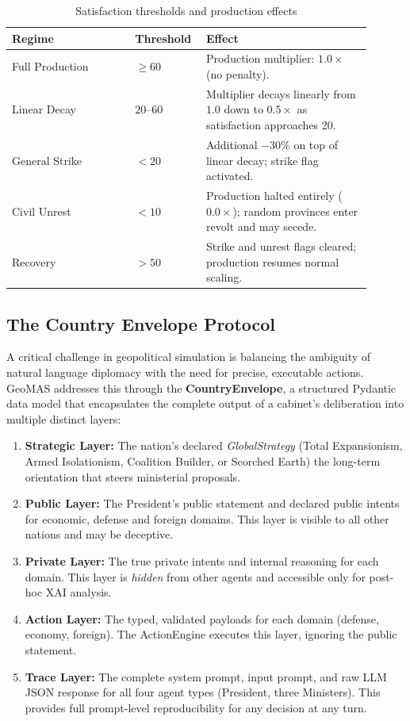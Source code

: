 \begin{table}[H]
\centering
\begin{tabular}{|p{0.32\linewidth}|p{0.15\linewidth}|p{0.43\linewidth}|}
\hline
\textbf{Regime} & \textbf{Threshold} & \textbf{Effect} \\ \hline
Full Production & $\geq 60$ & Production multiplier: $1.0\times$ (no penalty). \\ \hline
Linear Decay & $20$--$60$ & Multiplier decays linearly from $1.0$ down to $0.5\times$ as satisfaction approaches 20. \\ \hline
General Strike & $< 20$ & Additional $-30\%$ on top of linear decay; strike flag activated. \\ \hline
Civil Unrest & $< 10$ & Production halted entirely ($0.0\times$); random provinces enter revolt and may secede. \\ \hline
Recovery & $> 50$ & Strike and unrest flags cleared; production resumes normal scaling. \\ \hline
\end{tabular}
\caption{Satisfaction thresholds and production effects}
\label{tab:satisfaction}
\end{table}

\subsection{The Country Envelope Protocol}
\label{sec:envelope}
A critical challenge in geopolitical simulation is balancing the ambiguity of natural language diplomacy with the need for precise, executable actions. GeoMAS addresses this through the \textbf{CountryEnvelope}, a structured Pydantic data model that encapsulates the complete output of a cabinet's deliberation into multiple distinct layers:

\begin{enumerate}
    \item \textbf{Strategic Layer:} The nation's declared \textit{GlobalStrategy} (Total Expansionism, Armed Isolationism, Coalition Builder, or Scorched Earth) the long-term orientation that steers ministerial proposals.
    \item \textbf{Public Layer:} The President's public statement and declared public intents for economic, defense and foreign domains. This layer is visible to all other nations and may be deceptive.
    \item \textbf{Private Layer:} The true private intents and internal reasoning for each domain. This layer is \textit{hidden} from other agents and accessible only for post-hoc XAI analysis.
    \item \textbf{Action Layer:} The typed, validated payloads for each domain (defense, economy, foreign). The ActionEngine executes this layer, ignoring the public statement.
    \item \textbf{Trace Layer:} The complete system prompt, input prompt, and raw LLM JSON response for all four agent types (President, three Ministers). This provides full prompt-level reproducibility for any decision at any turn.
\end{enumerate}

